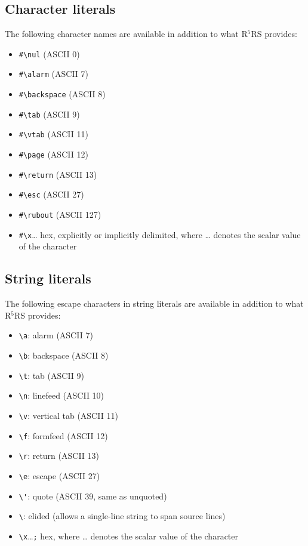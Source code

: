 \subsection{Character literals}

The following character names are available in addition to what
R$^5$RS provides:
%
\begin{itemize}
\item \verb|#\nul| (ASCII 0) 
\item \verb|#\alarm| (ASCII 7) 
\item \verb|#\backspace| (ASCII 8) 
\item \verb|#\tab| (ASCII 9) 
\item \verb|#\vtab| (ASCII 11) 
\item \verb|#\page| (ASCII 12) 
\item \verb|#\return| (ASCII 13) 
\item \verb|#\esc| (ASCII 27) 
\item \verb|#\rubout| (ASCII 127) 
\item \verb|#\x|\ldots{} hex, explicitly or implicitly
  delimited, where \ldots{} denotes the scalar value
  of the character
\end{itemize}

\subsection{String literals}

The following escape characters in string literals are available in addition to what
R$^5$RS provides:

\begin{itemize}
\item \verb|\a|: alarm (ASCII 7) 
\item \verb|\b|: backspace (ASCII 8) 
\item \verb|\t|: tab (ASCII 9) 
\item \verb|\n|: linefeed (ASCII 10) 
\item \verb|\v|: vertical tab (ASCII 11) 
\item \verb|\f|: formfeed (ASCII 12) 
\item \verb|\r|: return (ASCII 13) 
\item \verb|\e|: escape (ASCII 27) 
\item \verb|\'|: quote (ASCII 39, same as unquoted) 
\item \verb|\|: elided (allows a single-line string to
  span source lines)
\item \verb|\x|\ldots{}\verb|;| hex, where \ldots{}
  denotes the scalar value of the character
\end{itemize}

